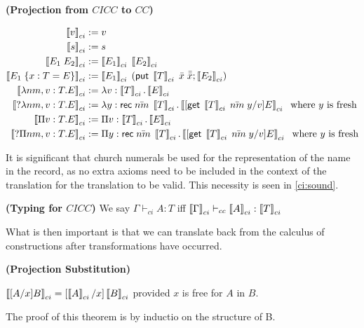 \begin{definition}
\textbf{ (Projection from $CICC$ to $CC$) }

\begin{align}
\left\llbracket v \right\rrbracket_{ci} &:= v
\\
\left\llbracket s \right\rrbracket_{ci} &:= s
\\
\left\llbracket E_1 \; E_2 \right\rrbracket_{ci} &:= \left\llbracket E_1 \right\rrbracket_{ci} \; \left\llbracket E_2 \right\rrbracket_{ci}
\\
\left\llbracket E_1 \; \{ x : T = E \} \right\rrbracket_{ci} &:= \left\llbracket E_1 \right\rrbracket_{ci} \; (\mathsf{put}\;\left\llbracket T \right\rrbracket_{ci}\;\bar{x}\; \bar{\bar{x}}; \left\llbracket E_2 \right\rrbracket_{ci} )
\\
\left\llbracket \lambda nm,v : T . E  \right\rrbracket_{ci} &:= \lambda v : \left\llbracket T \right\rrbracket_{ci} . \left\llbracket E \right\rrbracket_{ci}
\\
\left\llbracket ?\lambda nm,v : T . E  \right\rrbracket_{ci} &:= \lambda y : \mathsf{rec}\;\bar{nm}\; \left\llbracket T \right\rrbracket_{ci} . \left\llbracket  [ \mathsf{get}\; \left\llbracket T \right\rrbracket_{ci}\; \bar{nm}\; y  / v ] E \right\rrbracket_{ci}
\;\text{ where $y$ is fresh}
\\
\left\llbracket \Pi v : T . E  \right\rrbracket_{ci} &:= \Pi v : \left\llbracket T \right\rrbracket_{ci} . \left\llbracket E \right\rrbracket_{ci}
\\
\left\llbracket ?\Pi nm,v : T . E  \right\rrbracket_{ci} &:= \Pi y : \mathsf{rec}\;\bar{nm}\;\left\llbracket T \right\rrbracket_{ci} . \left\llbracket  [ \mathsf{get}\;\left\llbracket T \right\rrbracket_{ci}\; \bar{nm}\; y  / v ] E \right\rrbracket_{ci}
\;\text{ where $y$ is fresh}
\end{align}

\label{cicc:proj}
\end{definition}

It is significant that church numerals be used for the representation of the name in the record, 
as no extra axioms need to be included in the context of the translation for the translation to be valid.  
This necessity is seen in \ref{ci:sound}.

\begin{definition}
\textbf{(Typing for $CICC$)} We say $\Gamma \vdash_{ci} A : T$ iff $\left\llbracket \Gamma \right\rrbracket_{ci} \vdash_{cc} \left\llbracket A \right\rrbracket_{ci} : \left\llbracket T \right\rrbracket_{ci}$
\label{cicc:typing}
\end{definition}

What is then important is that we can translate back from the calculus of constructions after 
transformations have occurred.

\begin{theorem}
\textbf{(Projection Substitution)}  

$\left\llbracket [A/x] B \right\rrbracket_{ci} = [ \left\llbracket A \right\rrbracket_{ci} / x ] \left\llbracket B \right\rrbracket_{ci}$ provided $x$ is free for $A$ in $B$.

\end{theorem}

The proof of this theorem is by inductio on the structure of B.


